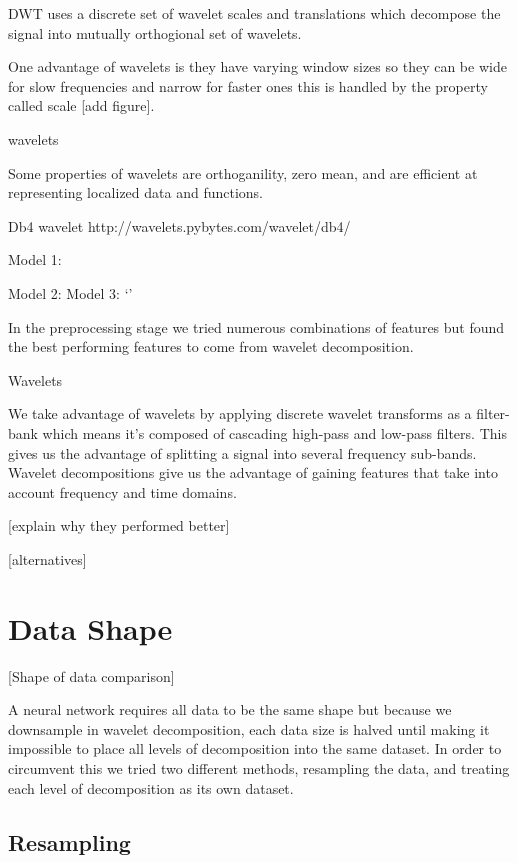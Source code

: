 \documentclass{turabian-thesis}
\begin{document}
DWT uses a discrete set of wavelet scales and translations which decompose the signal into mutually orthogional set of wavelets.

One advantage of wavelets is they have varying window sizes so they can be wide for slow frequencies and narrow for faster ones this is handled by the property called scale [add figure].

wavelets 


Some properties of wavelets are orthoganility, zero mean, and are efficient at representing localized data and functions.



Db4 wavelet http://wavelets.pybytes.com/wavelet/db4/

Model 1:


Model 2: 
Model 3: `'



In the preprocessing stage we tried numerous combinations of features but found the best performing features to come from wavelet decomposition.




Wavelets

We take advantage of wavelets by applying discrete wavelet transforms as a filter-bank which means it’s composed of cascading high-pass and low-pass filters. This gives us the advantage of splitting a signal into several frequency sub-bands. Wavelet decompositions give us the advantage of gaining features that take into account frequency and time domains. 

[explain why they performed better]


[alternatives]



\section{Data Shape}
[Shape of data comparison]

A neural network requires all data to be the same shape but because we downsample in wavelet decomposition, each data size is halved until making it impossible to place all levels of decomposition into the same dataset. In order to circumvent this we tried two different methods, resampling the data, and treating each level of decomposition as its own dataset.


\subsection{Resampling}
\end{document}
